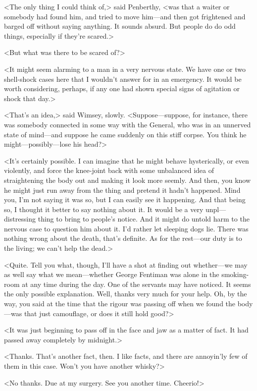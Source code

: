 <The only thing I could think of,> said Penberthy, <was that a waiter or somebody had found him, and tried to move him—and then got frightened and barged off without saying anything. It sounds absurd. But people do do odd things, especially if they're scared.>

<But what was there to be scared of?>

<It might seem alarming to a man in a very nervous state. We have one or two shell-shock cases here that I wouldn't answer for in an emergency. It would be worth considering, perhaps, if any one had shown special signs of agitation or shock that day.>

<That's an idea,> said Wimsey, slowly. <Suppose—suppose, for instance, there was somebody connected in some way with the General, who was in an unnerved state of mind—and suppose he came suddenly on this stiff corpse. You think he might—possibly—lose his head?>

<It's certainly possible. I can imagine that he might behave hysterically, or even violently, and force the knee-joint back with some unbalanced idea of straightening the body out and making it look more seemly. And then, you know he might just run away from the thing and pretend it hadn't happened. Mind you, I'm not saying it was so, but I can easily see it happening. And that being so, I thought it better to say nothing about it. It would be a very unpl—distressing thing to bring to people's notice. And it might do untold harm to the nervous case to question him about it. I'd rather let sleeping dogs lie. There was nothing wrong about the death, that's definite. As for the rest—our duty is to the living; we can't help the dead.>

<Quite. Tell you what, though, I'll have a shot at finding out whether—we may as well say what we mean—whether George Fentiman was alone in the smoking-room at any time during the day. One of the servants may have noticed. It seems the only possible explanation. Well, thanks very much for your help. Oh, by the way, you said at the time that the rigour was passing off when we found the body—was that just camouflage, or does it still hold good?>

<It was just beginning to pass off in the face and jaw as a matter of fact. It had passed away completely by midnight.>

<Thanks. That's another fact, then. I like facts, and there are annoyin'ly few of them in this case. Won't you have another whisky?>

<No thanks. Due at my surgery. See you another time. Cheerio!>

